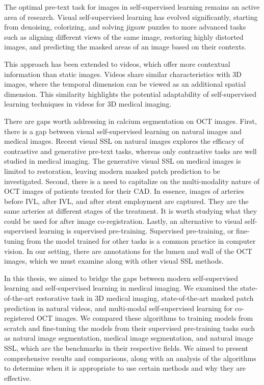\documentclass[a4paper,11pt,oneside]{report}
\begin{document}
The optimal pre-text task for images in self-supervised learning remains an active area of research. Visual self-supervised learning has evolved significantly, starting from denoising, colorizing, and solving jigsaw puzzles to more advanced tasks such as aligning different views of the same image, restoring highly distorted images, and predicting the masked areas of an image based on their contexts.

This approach has been extended to videos, which offer more contextual information than static images. Videos share similar characteristics with 3D images, where the temporal dimension can be viewed as an additional spatial dimension. This similarity highlights the potential adaptability of self-supervised learning techniques in videos for 3D medical imaging.

There are gaps worth addressing in calcium segmentation on OCT images. First, there is a gap between visual self-supervised learning on natural images and medical images. Recent visual SSL on natural images explores the efficacy of contrastive and generative pre-text tasks, whereas only contrastive tasks are well studied in medical imaging. The generative visual SSL on medical images is limited to restoration, leaving modern masked patch prediction to be investigated. Second, there is a need to capitalize on the multi-modality nature of OCT images of patients treated for their CAD. In essence, images of arteries before IVL, after IVL, and after stent employment are captured. They are the same arteries at different stages of the treatment. It is worth studying what they could be used for after image co-registration. Lastly, an alternative to visual self-supervised learning is supervised pre-training. Supervised pre-training, or fine-tuning from the model trained for other tasks is a common practice in computer vision. In our setting, there are annotations for the lumen and wall of the OCT images, which we must examine along with other visual SSL methods.

In this thesis, we aimed to bridge the gaps between modern self-supervised learning and self-supervised learning in medical imaging. We examined the state-of-the-art restorative task in 3D medical imaging, state-of-the-art masked patch prediction in natural videos, and multi-modal self-supervised learning for co-registered OCT images. We compared these algorithms to training models from scratch and fine-tuning the models from their supervised pre-training tasks such as natural image segmentation, medical image segmentation, and natural image SSL, which are the benchmarks in their respective fields. We aimed to present comprehensive results and comparisons, along with an analysis of the algorithms to determine when it is appropriate to use certain methods and why they are effective.
\end{document}
